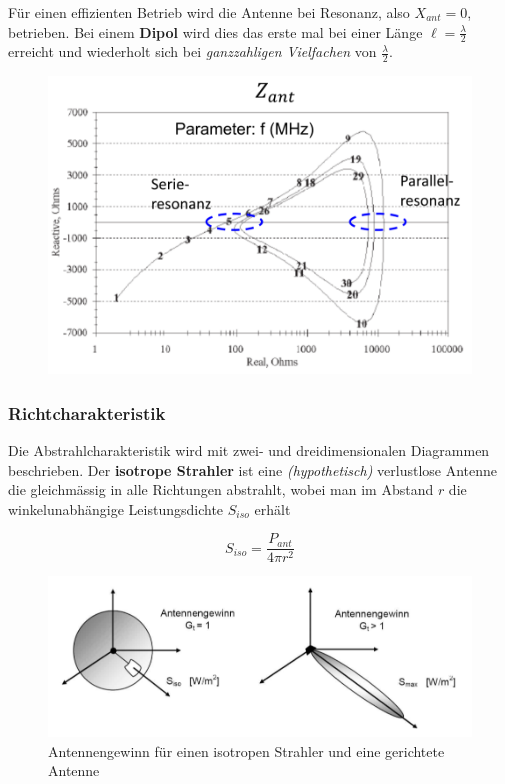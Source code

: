 \documentclass[
  10pt,
  a4paper,
  german]{article}
\numberwithin{equation}{section}
\begin{document}
Für einen effizienten Betrieb wird die Antenne bei Resonanz, also
\(X_{ant}=0\), betrieben. Bei einem \textbf{Dipol} wird dies das erste
mal bei einer Länge \(\ell=\frac{\lambda}{2}\) erreicht und wiederholt
sich bei \emph{ganzzahligen Vielfachen} von \(\frac{\lambda}{2}\).

\begin{figure}[H]

{\centering \includegraphics{images/04_ResonanceAntenna.png}

}

\end{figure}

\hypertarget{richtcharakteristik}{%
\subsubsection{Richtcharakteristik}\label{richtcharakteristik}}

Die Abstrahlcharakteristik wird mit zwei- und dreidimensionalen
Diagrammen beschrieben. Der \textbf{isotrope Strahler} ist eine
\emph{(hypothetisch)} verlustlose Antenne die gleichmässig in alle
Richtungen abstrahlt, wobei man im Abstand \(r\) die winkelunabhängige
Leistungsdichte \(S_{iso}\) erhält

\[
S_{iso}=\frac{P_{ant}}{4\pi r^2}
\]

\begin{figure}[H]

{\centering \includegraphics{images/04_IsotropGerichtet.png}

}

\caption{Antennengewinn für einen isotropen Strahler und eine gerichtete
Antenne}

\end{figure}
\end{document}

